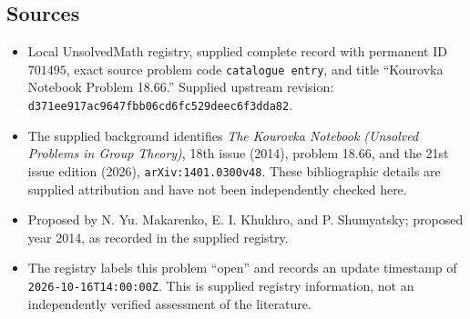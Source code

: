 \documentclass[11pt]{article}
\begin{document}
\subsection{Sources}
\begin{itemize}
\item Local UnsolvedMath registry, supplied complete record with permanent ID \(701495\), exact source problem code \texttt{catalogue entry}, and title ``Kourovka Notebook Problem 18.66.'' Supplied upstream revision: \texttt{d371ee917ac9647fbb06cd6fc529deec6f3dda82}.
\item The supplied background identifies \emph{The Kourovka Notebook (Unsolved Problems in Group Theory)}, 18th issue (2014), problem 18.66, and the 21st issue edition (2026), \texttt{arXiv:1401.0300v48}. These bibliographic details are supplied attribution and have not been independently checked here.
\item Proposed by N. Yu. Makarenko, E. I. Khukhro, and P. Shumyatsky; proposed year 2014, as recorded in the supplied registry.
\item The registry labels this problem ``open'' and records an update timestamp of \texttt{2026-10-16T14:00:00Z}. This is supplied registry information, not an independently verified assessment of the literature.
\end{itemize}
\end{document}
